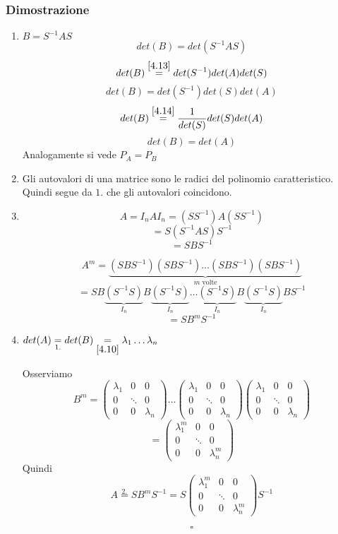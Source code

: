\documentclass[a4paper]{article}
\theoremstyle{break}
\theoremstyle{break}
\theoremstyle{break}
\theoremstyle{break}
\begin{document}
\subsubsection{Dimostrazione}
\begin{enumerate}
  \item \( B = S^{-1}AS \) 
    \[
    det(B) = det(S^{-1}AS)
    \] 
    \[
      det(B) \stackrel{\ref{4.13}}{=} det(S^{-1})det(A)det(S)
    \] 
    \[
    det(B) = det(S^{-1})det(S)det(A)
    \] 
    \[
    det(B) \stackrel{\ref{4.14}}{=} \frac{1}{det(S)}det(S)det(A)
    \] 
    \[
    det(B) = det(A)
    \] 
    Analogamente si vede \( P_A = P_B \) 

  \item Gli autovalori di una matrice sono le radici del polinomio caratteristico.
    Quindi segue da \( 1. \) che gli autovalori coincidono.

  \item \[
  A = I_n A I_n = (SS^{-1})A(SS^{-1})
  \] 
  \[
   = S(S^{-1}AS)S^{-1}
  \] 
  \[
  = SBS^{-1}
  \] 

  \vspace{1em}
  \[
    A^m = \underbrace{(SBS^{-1})(SBS^{-1})\ldots(SBS^{-1})(SBS^{-1})}_{m\text{ volte}}
  \] 
  \[
    = SB\underbrace{(S^{-1}S)}_{I_n}B\underbrace{(S^{-1}S)}_{I_n}\ldots\underbrace{(S^{-1}S)}_{I_n}B\underbrace{(S^{-1}S)}_{I_n}BS^{-1}
  \] 
  \[
    = SB^mS^{-1}
  \] 

\item \( det(A) \underset{1.}{=} det(B) \underset{\ref{4.10}}{=} \lambda_1 \ldots \lambda_n \)

  \noindent Osserviamo
  \[
  B^m = \begin{pmatrix} 
    \lambda_1 & 0 & 0\\
    0 & \ddots & 0\\
    0 & 0 & \lambda_n
  \end{pmatrix} 
  \ldots
  \begin{pmatrix} 
    \lambda_1 & 0 & 0\\
    0 & \ddots & 0\\
    0 & 0 & \lambda_n
  \end{pmatrix}
  \begin{pmatrix} 
    \lambda_1 & 0 & 0\\
    0 & \ddots & 0\\
    0 & 0 & \lambda_n
  \end{pmatrix} 
  \] 
  \[
  = \begin{pmatrix} 
    \lambda_1^m & 0 & 0\\
    0 & \ddots & 0\\
    0 & 0 & \lambda_n^m
  \end{pmatrix} 
  \] 
  Quindi \[ A \stackrel{2.}{=} SB^mS^{-1} = S \begin{pmatrix} 
    \lambda_1^m & 0 & 0\\
    0 & \ddots & 0\\
    0 & 0 & \lambda_n^m
  \end{pmatrix}
  S^{-1}
\] 

\[
\square
\] 
\end{enumerate}
\end{document}
